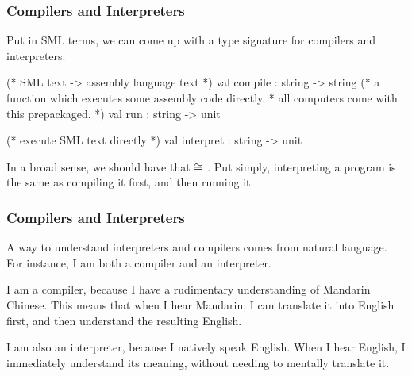 \documentclass[aspectratio=169, handout]{beamer}
\begin{document}
\begin{frame}[fragile]
  \frametitle{Compilers and Interpreters}

  \tgs

  Put in SML terms, we can come up with a type signature for compilers and
  interpreters:
  \pause
  \begin{codeblock}
    (* SML text -> assembly language text *)
    val compile : string -> string
    (* a function which executes some assembly code directly.
     * all computers come with this prepackaged. *)
    val run : string -> unit

    (* execute SML text directly *)
    val interpret : string -> unit
  \end{codeblock}

  \pause
  \vspace{\fill}

  In a broad sense, we should have that  $\cong$ .
  Put simply, interpreting a program is the same as compiling it first, and then
  running it.
\end{frame}

\begin{frame}[fragile]
  \frametitle{Compilers and Interpreters}

  A way to understand interpreters and compilers comes from natural language. For
  instance, I am both a compiler and an interpreter.

  \pause
  \vspace{\fill}

  I am a compiler, because I have a rudimentary understanding of Mandarin
  Chinese. This means that when I hear Mandarin, I can translate it into English
  first, and then understand the resulting English.

  \pause
  \vspace{\fill}

  I am also an interpreter, because I natively speak English. When I hear English,
  I immediately understand its meaning, without needing to mentally translate it.
\end{frame}
\end{document}
